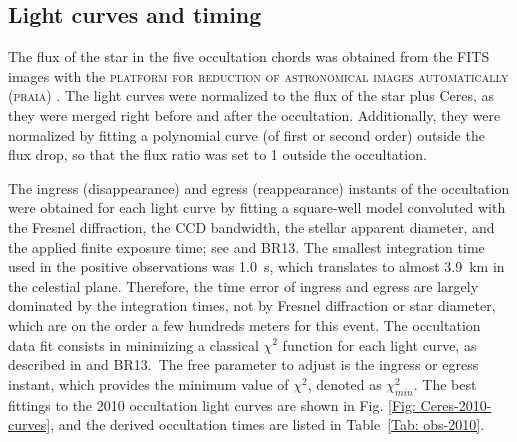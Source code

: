 \documentclass[useAMS,usenatbib]{mn2e}
\begin{document}
\subsection{Light curves and timing \label{Sec: light-curve-2010}}

The flux of the star in the five occultation chords was obtained from the FITS images with the \textsc{platform for reduction of astronomical images automatically (praia)} \citep{2011gfun.conf...85A}. The light curves were normalized to the flux of the star plus Ceres, as they were merged right before and after the occultation. Additionally,
 they were normalized by fitting a polynomial curve (of first or second order) outside the flux drop, so that the flux ratio was set to 1 outside the occultation.

The ingress (disappearance) and egress (reappearance) instants of the occultation were obtained for each light curve by fitting a square-well model convoluted with the Fresnel diffraction, the CCD bandwidth, the stellar apparent diameter, and the applied finite exposure time; see \cite{Widemann2009} and BR13. %
The smallest integration time used in the positive observations was 1.0~s, which translates to almost 3.9~km in the celestial plane. Therefore, the time error of ingress and egress are largely dominated by the integration times, not by Fresnel diffraction or star diameter, which are on the order a few hundreds meters for this event.
The occultation data fit consists in minimizing a classical $\chi^{2}$ function for each light curve, as described in \cite{Sicardy2011} and BR13.\ The free parameter to adjust is the ingress or egress instant, which provides the minimum value of $\chi^{2}$, denoted as $\chi^{2}_{min}$. The best fittings to the 2010 occultation light curves are shown in Fig. \ref{Fig: Ceres-2010-curves}, and the derived occultation times are listed in Table~\ref{Tab: obs-2010}.
\end{document}
